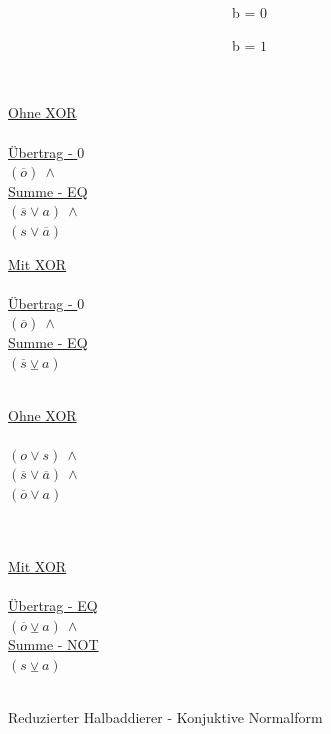 \begin{figure}[!h]
  \centering
  \begin{minipage}[c]{0.3cm}
    ~
  \end{minipage}
  \begin{minipage}[c]{7.1cm}
    ~~~~~~~~~~~~~~~~~~~~~~~~~~~~~~~~b = $0$
  \end{minipage}
  \begin{minipage}[c]{7cm}
    ~~~~~~~~~~~~~~~~~~~~~~~~~~~~~~~~b = $1$
  \end{minipage}
  \begin{minipage}[l]{0.4cm}
    ~
  \end{minipage}
  \begin{minipage}[l]{3.5cm}
    \underline{Ohne XOR}\\
    ~\\
    \underline{Übertrag - $0$}\\
    $ (\overline{o}) ~ \wedge $\\
    \underline{Summe - EQ}\\
    $ (\overline{s} \vee  a) ~ \wedge $\\
    $ (s \vee \overline{a}) $
  \end{minipage}
  \begin{minipage}[l]{3.5cm}
    \underline{Mit XOR}\\
    ~\\
    \underline{Übertrag - $0$}\\
    $ (\overline{o}) ~ \wedge $\\
    \underline{Summe - EQ}\\
    $ (\overline{s} \veebar a) $\\
    ~
  \end{minipage}
  \begin{minipage}[l]{3.5cm}
    \underline{Ohne XOR}\\
    ~\\
    $ (o \vee  s) ~ \wedge $\\
    $ (\overline{s} \vee  \overline{a}) ~ \wedge $\\
    $ (\overline{o} \vee  a) $\\
    ~\\
    ~
  \end{minipage}
  \begin{minipage}[l]{3.5cm}
    \underline{Mit XOR}\\
    ~\\
    \underline{Übertrag - EQ}\\
    $ (\overline{o} \veebar a) ~ \wedge $\\
    \underline{Summe - NOT}\\
    $ (s \veebar a) $\\
    ~
  \end{minipage}
  \caption{Reduzierter Halbaddierer - Konjuktive Normalform}
  \label{fig:red_halfadder_cnf}
\end{figure}

